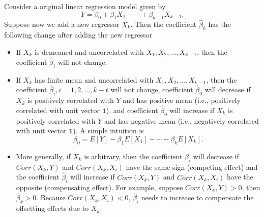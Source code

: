 \begin{refsection}
\begin{remark}
Consider a original linear regression model	given by
$$Y = \beta_0 + \beta_1 X_1 + \cdots + \beta_{k-1} X_{k-1}. $$
Suppose now we add a new regressor $X_k$. Then the coefficient $\hat{\beta}_k$ has the following change after adding the new regressor
\begin{itemize}
	\item If $X_{k}$ is demeaned and uncorrelated with $X_1,X_2,...,X_{k-1}$, then the coefficient $\hat{\beta}_i$ will not change.
	\item If $X_{k}$ has finite mean and uncorrelated with $X_1,X_2,...,X_{k-1}$, then the coefficient $\hat{\beta}_i, i=1,2,...,k-t$ will not change, coefficient $\hat{\beta}_0$ will decrease if $X_k$ is positively correlated with $Y$ and has positive mean (i.e., positively correlated with unit vector $\bm{1}$), and coefficient $\hat{\beta}_0$ will increase if $X_k$ is positively correlated with $Y$ and has negative mean (i.e., negatively correlated with unit vector $\bm{1}$). A simple intuition is
	$$\beta_0 = E[Y] - \beta_1E[X_1] - \cdots - \beta_{k}E[X_k].$$
	\item More generally, if $X_{k}$ is arbitrary, then the coefficient $\hat{\beta}_i$ will decrease if $Corr(X_k,Y)$ and $Corr(X_k,X_i)$ have the same sign (competing effect) and the coefficient $\hat{\beta}_i$ will increase if $Corr(X_k,Y)$ and $Corr(X_k,X_i)$ have the opposite (compensating effect). For example, suppose $Corr(X_k,Y) > 0$, then $\hat{\beta}_k > 0$. Because $Corr(X_k,X_i) < 0$, $\hat{\beta}_i$ needs to increase to compensate the offsetting effects due to $X_k$.
\end{itemize}
\end{remark}



\end{refsection}
